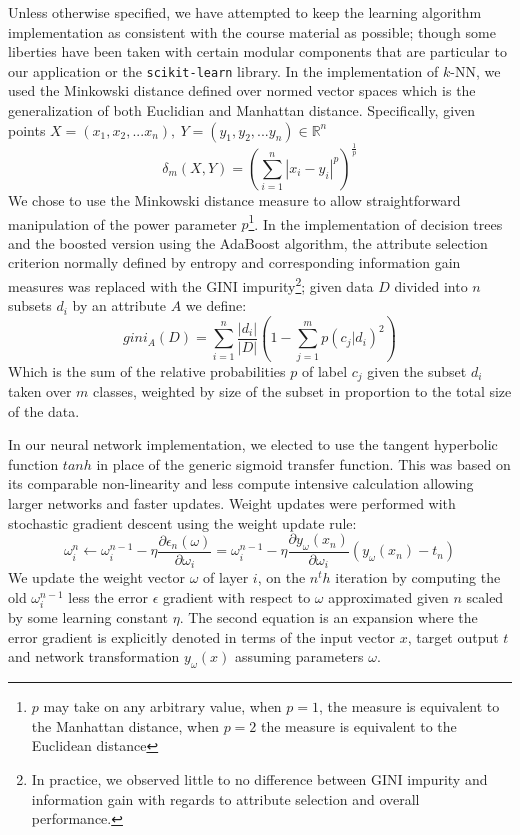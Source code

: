 \documentclass[12pt]{article}
\begin{document}
Unless otherwise specified, we have attempted to keep the learning algorithm implementation as consistent with the course material as possible; though some liberties have been taken with certain modular components that are particular to our application or the \texttt{scikit-learn} library. In the implementation of $k$-NN, we used the Minkowski distance defined over normed vector spaces which is the generalization of both Euclidian and Manhattan distance. Specifically, given points $X = (x_1, x_2, ... x_n), \ Y = (y_1, y_2, ... y_n) \in \mathbb{R}^n$
\begin{equation}
\delta_m(X,Y) = (\sum_{i=1}^n|x_i-y_i|^p)^{\frac{1}{p}}
\end{equation}
We chose to use the Minkowski distance measure to allow straightforward manipulation of the power parameter $p$\footnote{$p$ may take on any arbitrary value, when $p=1$, the measure is equivalent to the Manhattan distance, when $p=2$ the measure is equivalent to the Euclidean distance}. In the implementation of decision trees and the boosted version using the AdaBoost algorithm, the attribute selection criterion normally defined by entropy and corresponding information gain measures was replaced with the GINI impurity\footnote{In practice, we observed little to no difference between GINI impurity and information gain with regards to attribute selection and overall performance.}; given data $D$ divided into $n$ subsets $d_i$ by an attribute $A$ we define:
\begin{equation}
gini_A(D) = \sum_{i=1}^n\frac{|d_i|}{|D|}(1-\sum_{j=1}^m p(c_j|d_i)^2)
\end{equation}
Which is the sum of the relative probabilities $p$ of label $c_j$ given the subset $d_i$ taken over $m$ classes, weighted by size of the subset in proportion to the total size of the data.

In our neural network implementation, we elected to use the tangent hyperbolic function $tanh$ in place of the generic sigmoid transfer function. This was based on its comparable non-linearity and less compute intensive calculation allowing larger networks and faster updates. Weight updates were performed with stochastic gradient descent using the weight update rule:
\begin{equation}
\omega_i^n \leftarrow \omega_i^{n-1}-\eta \frac{\partial\epsilon_n(\omega)}{\partial\omega_i} = \omega_i^{n-1}-\eta \frac{\partial y_\omega(x_n)}{\partial \omega_i}(y_\omega(x_n)-t_n)
\end{equation}
We update the weight vector $\omega$ of layer $i$, on the $n^th$ iteration by computing the old $\omega_i^{n-1}$ less the error $\epsilon$ gradient with respect to $\omega$ approximated given $n$ scaled by some learning constant $\eta$. The second equation is an expansion where the error gradient is explicitly denoted in terms of the input vector $x$, target output $t$ and network transformation $y_\omega(x)$ assuming parameters $\omega$.
\end{document}
